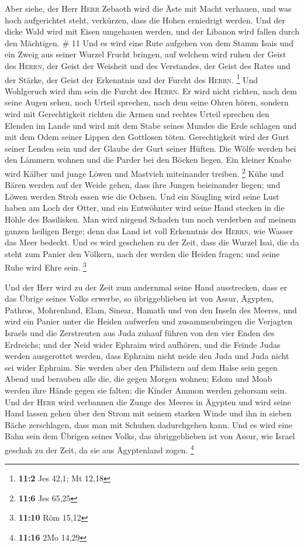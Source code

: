  Aber siehe, der Herr \textsc{Herr} Zebaoth wird die Äste
mit Macht verhauen, und was hoch aufgerichtet steht, verkürzen, dass die
Hohen erniedrigt werden.  Und der dicke Wald wird mit
Eisen umgehauen werden, und der Libanon wird fallen durch den Mächtigen.
\# 11  Und es wird eine Rute aufgehen von dem Stamm Isais
und ein Zweig aus seiner Wurzel Frucht bringen,  auf
welchem wird ruhen der Geist des \textsc{Herrn}, der Geist der Weisheit
und des Verstandes, der Geist des Rates und der Stärke, der Geist der
Erkenntnis und der Furcht des \textsc{Herrn}. \footnote{\textbf{11:2}
  Jes 42,1; Mt 12,18}  Und Wohlgeruch wird ihm sein die
Furcht des \textsc{Herrn}. Er wird nicht richten, nach dem seine Augen
sehen, noch Urteil sprechen, nach dem seine Ohren hören, 
sondern wird mit Gerechtigkeit richten die Armen und rechtes Urteil
sprechen den Elenden im Lande und wird mit dem Stabe seines Mundes die
Erde schlagen und mit dem Odem seiner Lippen den Gottlosen töten.
 Gerechtigkeit wird der Gurt seiner Lenden sein und der
Glaube der Gurt seiner Hüften.  Die Wölfe werden bei den
Lämmern wohnen und die Parder bei den Böcken liegen. Ein kleiner Knabe
wird Kälber und junge Löwen und Mastvieh miteinander treiben.
\footnote{\textbf{11:6} Jes 65,25}  Kühe und Bären werden
auf der Weide gehen, dass ihre Jungen beieinander liegen; und Löwen
werden Stroh essen wie die Ochsen.  Und ein Säugling wird
seine Lust haben am Loch der Otter, und ein Entwöhnter wird seine Hand
stecken in die Höhle des Basilisken.  Man wird nirgend
Schaden tun noch verderben auf meinem ganzen heiligen Berge; denn das
Land ist voll Erkenntnis des \textsc{Herrn}, wie Wasser das Meer
bedeckt.  Und es wird geschehen zu der Zeit, dass die
Wurzel Isai, die da steht zum Panier den Völkern, nach der werden die
Heiden fragen; und seine Ruhe wird Ehre sein. \footnote{\textbf{11:10}
  Röm 15,12}

 Und der Herr wird zu der Zeit zum andernmal seine Hand
ausstrecken, dass er das Übrige seines Volks erwerbe, so übriggeblieben
ist von Assur, Ägypten, Pathros, Mohrenland, Elam, Sinear, Hamath und
von den Inseln des Meeres,  und wird ein Panier unter die
Heiden aufwerfen und zusammenbringen die Verjagten Israels und die
Zerstreuten aus Juda zuhauf führen von den vier Enden des Erdreichs;
 und der Neid wider Ephraim wird aufhören, und die Feinde
Judas werden ausgerottet werden, dass Ephraim nicht neide den Juda und
Juda nicht sei wider Ephraim.  Sie werden aber den
Philistern auf dem Halse sein gegen Abend und berauben alle die, die
gegen Morgen wohnen; Edom und Moab werden ihre Hände gegen sie falten;
die Kinder Ammon werden gehorsam sein.  Und der
\textsc{Herr} wird verbannen die Zunge des Meeres in Ägypten und wird
seine Hand lassen gehen über den Strom mit seinem starken Winde und ihn
in sieben Bäche zerschlagen, dass man mit Schuhen dadurchgehen kann.
 Und es wird eine Bahn sein dem Übrigen seines Volks, das
übriggeblieben ist von Assur, wie Israel geschah zu der Zeit, da sie aus
Ägyptenland zogen. \footnote{\textbf{11:16} 2Mo 14,29}

